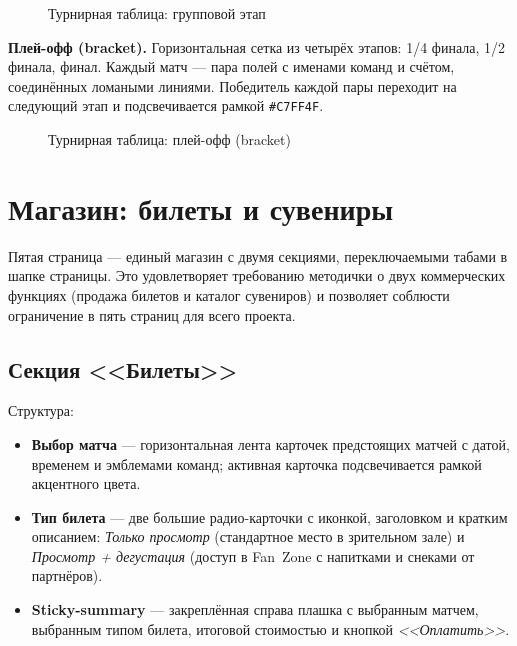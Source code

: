 \begin{figure}[h]
  \centering
  \caption{Турнирная таблица: групповой этап}
  \label{fig:tournament_groups}
\end{figure}

\textbf{Плей-офф (bracket).} Горизонтальная сетка из четырёх
этапов: 1/4 финала, 1/2 финала, финал. Каждый матч --- пара
полей с именами команд и счётом, соединённых ломаными линиями.
Победитель каждой пары переходит на следующий этап и подсвечивается
рамкой \texttt{\#C7FF4F}.

\begin{figure}[h]
  \centering
  \caption{Турнирная таблица: плей-офф (bracket)}
  \label{fig:tournament_bracket}
\end{figure}

\section{Магазин: билеты и сувениры}

Пятая страница --- единый магазин с двумя секциями, переключаемыми
табами в шапке страницы. Это удовлетворяет требованию методички о
двух коммерческих функциях (продажа билетов и каталог сувениров) и
позволяет соблюсти ограничение в пять страниц для всего проекта.

\subsection{Секция <<Билеты>>}

Структура:
\begin{itemize}
  \item \textbf{Выбор матча} --- горизонтальная лента карточек
        предстоящих матчей с датой, временем и эмблемами команд;
        активная карточка подсвечивается рамкой акцентного цвета.
  \item \textbf{Тип билета} --- две большие радио-карточки с
        иконкой, заголовком и кратким описанием:
        \textit{Только просмотр} (стандартное место в зрительном
        зале) и \textit{Просмотр + дегустация} (доступ в
        Fan~Zone с напитками и снеками от партнёров).
  \item \textbf{Sticky-summary} --- закреплённая справа плашка
        с выбранным матчем, выбранным типом билета, итоговой
        стоимостью и кнопкой \textit{<<Оплатить>>}.
\end{itemize}

